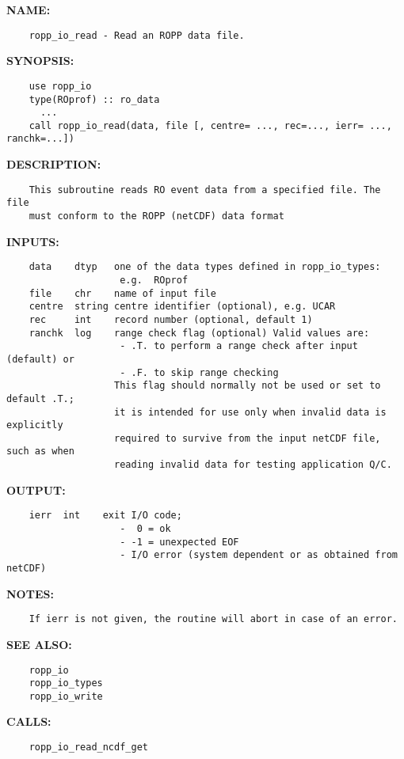 \label{ch:robo95}
\label{ch:Reading_ropp_io_read}
\textbf{NAME:}\hspace{0.08in}\begin{Verbatim}
    ropp_io_read - Read an ROPP data file.
\end{Verbatim}
\textbf{SYNOPSIS:}\hspace{0.08in}\begin{Verbatim}
    use ropp_io
    type(ROprof) :: ro_data
      ...
    call ropp_io_read(data, file [, centre= ..., rec=..., ierr= ..., ranchk=...])
\end{Verbatim}
\textbf{DESCRIPTION:}\hspace{0.08in}\begin{Verbatim}
    This subroutine reads RO event data from a specified file. The file
    must conform to the ROPP (netCDF) data format
\end{Verbatim}
\textbf{INPUTS:}\hspace{0.08in}\begin{Verbatim}
    data    dtyp   one of the data types defined in ropp_io_types:
                    e.g.  ROprof
    file    chr    name of input file
    centre  string centre identifier (optional), e.g. UCAR
    rec     int    record number (optional, default 1)
    ranchk  log    range check flag (optional) Valid values are:
                    - .T. to perform a range check after input (default) or
                    - .F. to skip range checking
                   This flag should normally not be used or set to default .T.;
                   it is intended for use only when invalid data is explicitly
                   required to survive from the input netCDF file, such as when
                   reading invalid data for testing application Q/C.
\end{Verbatim}
\textbf{OUTPUT:}\hspace{0.08in}\begin{Verbatim}
    ierr  int    exit I/O code;
                    -  0 = ok
                    - -1 = unexpected EOF
                    - I/O error (system dependent or as obtained from netCDF)
\end{Verbatim}
\textbf{NOTES:}\hspace{0.08in}\begin{Verbatim}
    If ierr is not given, the routine will abort in case of an error.
\end{Verbatim}
\textbf{SEE ALSO:}\hspace{0.08in}\begin{Verbatim}
    ropp_io
    ropp_io_types
    ropp_io_write
\end{Verbatim}
\textbf{CALLS:}\hspace{0.08in}\begin{Verbatim}
    ropp_io_read_ncdf_get
\end{Verbatim}
